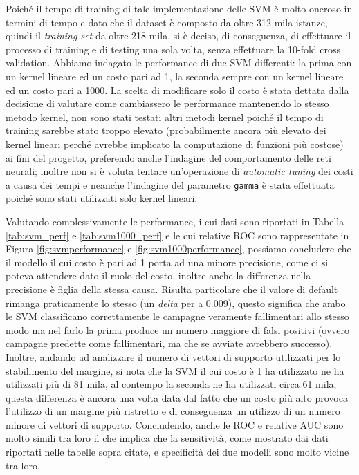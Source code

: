 Poiché il tempo di training di tale implementazione delle SVM è molto oneroso in termini di tempo e dato che il dataset è composto da oltre 312 mila istanze, quindi il \textit{training set} da oltre 218 mila, si è deciso, di conseguenza, di effettuare il processo di training e di testing una sola volta, senza effettuare la 10-fold cross validation.
Abbiamo indagato le performance di due SVM differenti: la prima con un kernel lineare ed un costo pari ad 1, la seconda sempre con un kernel lineare ed un costo pari a 1000. 
La scelta di modificare solo il costo è stata dettata dalla decisione di valutare come cambiassero le performance mantenendo lo stesso metodo kernel, non sono stati testati altri metodi kernel poiché il tempo di training sarebbe stato troppo elevato (probabilmente ancora più elevato dei kernel lineari perché avrebbe implicato la computazione di funzioni più costose) ai fini del progetto, preferendo anche l'indagine del comportamento delle reti neurali; inoltre non si è voluta tentare un'operazione di \textit{automatic tuning} dei costi a causa dei tempi e neanche l'indagine del parametro \texttt{gamma} è stata effettuata poiché sono stati utilizzati solo kernel lineari.

Valutando complessivamente le performance, i cui dati sono riportati in Tabella \ref{tab:svm_perf} e \ref{tab:svm1000_perf} e le cui relative ROC sono rappresentate in Figura \ref{fig:svmperformance} e \ref{fig:svm1000performance}, possiamo concludere che il modello il cui costo è pari ad 1 porta ad una minore precisione, come ci si poteva attendere dato il ruolo del costo, inoltre anche la differenza nella precisione è figlia della stessa causa.
Risulta particolare che il valore di default rimanga praticamente lo stesso (un \textit{delta} per a 0.009), questo significa che ambo le SVM classificano correttamente le campagne veramente fallimentari allo stesso modo ma nel farlo la prima produce un numero maggiore di falsi positivi (ovvero campagne predette come fallimentari, ma che se avviate avrebbero successo). 
Inoltre, andando ad analizzare il numero di vettori di supporto utilizzati per lo stabilimento del margine, si nota che la SVM il cui costo è 1 ha utilizzato ne ha utilizzati più di 81 mila, al contempo la seconda ne ha utilizzati circa 61 mila; questa differenza è ancora una volta data dal fatto che un costo più alto provoca l'utilizzo di un margine più ristretto e di conseguenza un utilizzo di un numero minore di vettori di supporto.
Concludendo, anche le ROC e relative AUC sono molto simili tra loro il che implica che la sensitività, come mostrato dai dati riportati nelle tabelle sopra citate, e specificità dei due modelli sono molto vicine tra loro.

